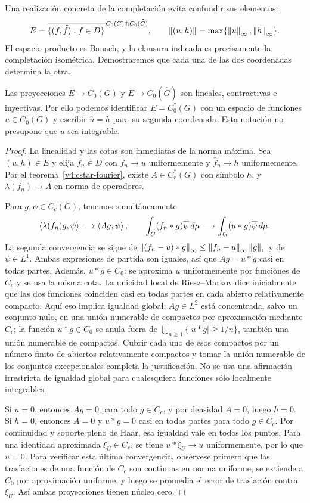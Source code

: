 Una realización concreta de la completación evita confundir sus elementos:
\[
 E=\overline{\{(f,\widehat f):f\in D\}}
 ^{\,C_0(G)\oplus C_0(\widehat G)},\qquad
 \left\lVert(u,h)\right\rVert=\max\{\left\lVert u\right\rVert_\infty,\left\lVert h\right\rVert_\infty\}.
\]
El espacio producto es Banach, y la clausura indicada es precisamente la completación isométrica. Demostraremos que cada una de las dos coordenadas determina la otra.

\begin{proposicion}\label{v4:grafo-fourier-inyectivo}
Las proyecciones $E\to C_0(G)$ y $E\to C_0(\widehat G)$ son lineales, contractivas e inyectivas. Por ello podemos identificar $E=C_0^*(G)$ con un espacio de funciones $u\in C_0(G)$ y escribir $\widehat u=h$ para su segunda coordenada. Esta notación no presupone que $u$ sea integrable.
\end{proposicion}
\begin{proof}
La linealidad y las cotas son inmediatas de la norma máxima. Sea $(u,h)\in E$ y elija $f_n\in D$ con $f_n\to u$ uniformemente y $\widehat f_n\to h$ uniformemente. Por el teorema~\ref{v4:cstar-fourier}, existe $A\in C_r^*(G)$ con símbolo $h$, y $\lambda(f_n)\to A$ en norma de operadores.

Para $g,\psi\in C_c(G)$, tenemos simultáneamente
\[
 \left\langle\lambda(f_n)g,\psi\right\rangle\longrightarrow\left\langle Ag,\psi\right\rangle,
 \qquad
 \int_G(f_n*g)\overline\psi\,d\mu
 \longrightarrow\int_G(u*g)\overline\psi\,d\mu.
\]
La segunda convergencia se sigue de
$\left\lVert(f_n-u)*g\right\rVert_\infty\le\left\lVert f_n-u\right\rVert_\infty\left\lVert g\right\rVert_1$
y de $\psi\in L^1$. Ambas expresiones de partida son iguales, así que $Ag=u*g$ casi en todas partes. Además, $u*g\in C_0$: se aproxima $u$ uniformemente por funciones de $C_c$ y se usa la misma cota. La unicidad local de Riesz--Markov dice inicialmente que las dos funciones coinciden casi en todas partes en cada abierto relativamente compacto. Aquí eso implica igualdad global: $Ag\in L^2$ está concentrada, salvo un conjunto nulo, en una unión numerable de compactos por aproximación mediante $C_c$; la función $u*g\in C_0$ se anula fuera de $\bigcup_{n\ge1}\{|u*g|\ge1/n\}$, también una unión numerable de compactos. Cubrir cada uno de esos compactos por un número finito de abiertos relativamente compactos y tomar la unión numerable de los conjuntos excepcionales completa la justificación. No se usa una afirmación irrestricta de igualdad global para cualesquiera funciones sólo localmente integrables.

Si $u=0$, entonces $Ag=0$ para todo $g\in C_c$, y por densidad $A=0$, luego $h=0$. Si $h=0$, entonces $A=0$ y $u*g=0$ casi en todas partes para todo $g\in C_c$. Por continuidad y soporte pleno de Haar, esa igualdad vale en todos los puntos. Para una identidad aproximada $\xi_U\in C_c$, se tiene $u*\xi_U\to u$ uniformemente, por lo que $u=0$. Para verificar esta última convergencia, obsérvese primero que las traslaciones de una función de $C_c$ son continuas en norma uniforme; se extiende a $C_0$ por aproximación uniforme, y luego se promedia el error de traslación contra $\xi_U$. Así ambas proyecciones tienen núcleo cero.
\end{proof}

